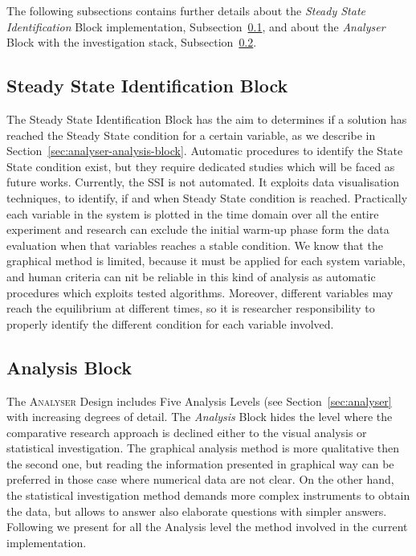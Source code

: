 The following subsections contains further details about the \textit{Steady State Identification} Block implementation, Subsection~\ref{sec:analyser-impl-ss-block}, and about the \textit{Analyser} Block with the investigation stack, Subsection~\ref{sec:analyser-impl-analysis-block}.

\subsection{Steady State Identification Block}\label{sec:analyser-impl-ss-block}

The Steady State Identification Block has the aim to  determines if a solution has reached the Steady State condition for a certain variable, as we describe in Section~\ref{sec:analyser-analysis-block}. Automatic procedures to identify the State State condition exist, but they require dedicated studies which will be faced as future works. Currently, the SSI is not automated. It exploits data visualisation techniques, to identify, if and when Steady State condition is reached. Practically each variable in the system is plotted in the time domain over all the entire experiment and research can exclude  the initial warm-up phase form the data evaluation when that variables reaches a stable condition. 
We know that the graphical method is limited, because it must be applied for each system variable, and human criteria can nit be reliable in this kind of analysis as automatic procedures which exploits tested algorithms. Moreover, different variables may reach the equilibrium at different times, so it is researcher responsibility to properly identify the different condition for each variable involved.

\subsection{Analysis Block}\label{sec:analyser-impl-analysis-block}

\noindent The \textsc{Analyser} Design includes Five Analysis Levels (see Section~\ref{sec:analyser} with increasing degrees of detail. The \textit{Analysis} Block hides the level where the comparative research approach is declined either to the visual analysis or statistical investigation. The graphical analysis method is more qualitative then the second one, but reading the information presented in graphical way can be preferred in those case where numerical data are not clear. On the other hand, the statistical investigation method demands more complex instruments to obtain the data, but allows to answer also elaborate questions with simpler answers. Following we present for all the Analysis level the method involved in the current implementation.

